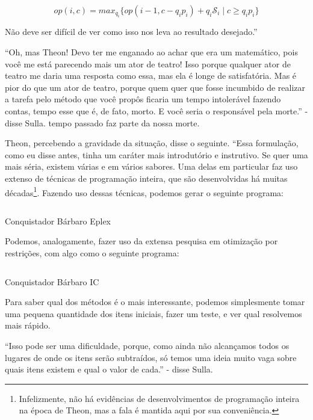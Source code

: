 \documentclass{article}
\begin{document}
\[
op(i,c) = max_{q_i}\{op(i-1, c-q_i p_i) + q_i \mathscr{S}_i\; |\; c
\geq q_i p_i\}
\]

Não deve ser difícil de ver como isso nos leva ao resultado
desejado.''

``Oh, mas Theon! Devo ter me enganado ao achar que era um matemático,
pois você me está parecendo mais um ator de teatro! Isso porque
qualquer ator de teatro me daria uma resposta como essa, mas ela é
longe de satisfatória. Mas é pior do que um ator de teatro, porque
quem quer que fosse incumbido de realizar a tarefa pelo método que
você propôs ficaria um tempo intolerável fazendo contas, tempo esse
que é, de fato, morto.  E você seria o responsável pela morte.'' -
disse Sulla.  %
tempo passado faz parte da nossa morte.

Theon, percebendo a gravidade da situação, disse o seguinte. ``Essa
formulação, como eu disse antes, tinha um caráter mais introdutório
e instrutivo. Se quer uma mais séria, existem várias e em vários
sabores. Uma delas em particular faz uso extenso de técnicas de
programação inteira, que são desenvolvidas há muitas
décadas\footnote{Infelizmente, não há evidências de desenvolvimentos
  de programação inteira na época de Theon, mas a fala é mantida
  aqui por sua conveniência.}. Fazendo uso dessas técnicas, podemos
gerar o seguinte programa:

\begin{listing}
  \inputminted{prolog}{../Exemplos/Cap12/prog1-knapSackEplex.ecl}
  \caption{Conquistador Bárbaro Eplex}\label{lst:knapsackEplex}
\end{listing}

Podemos, analogamente, fazer uso da extensa pesquisa em otimização
por restrições, com algo como o seguinte programa:

\begin{listing}[H]
  \inputminted{prolog}{../Exemplos/Cap12/prog2-knapSackIc.ecl}
  \caption{Conquistador Bárbaro IC}\label{lst:knapsackIC}
\end{listing}

Para saber qual dos métodos é o mais interessante, podemos
simplesmente tomar uma pequena quantidade dos itens iniciais, fazer
um teste, e ver qual resolvemos mais rápido.

``Isso pode ser uma dificuldade, porque, como ainda não alcançamos
todos os lugares de onde os itens serão subtraídos, só temos uma
ideia muito vaga sobre quais itens existem e qual o valor de cada.''
- disse Sulla.
\end{document}
